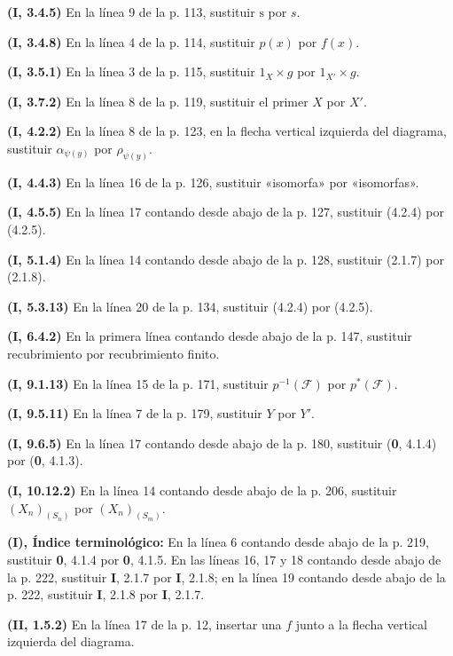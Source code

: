 \documentclass[10pt,oneside]{book}
\newcommand{\oldpage}[2][]{\setcounter{footnote}{0}\marginpar{\scriptsize\textbf{#1}~|~#2}\ignorespaces}
\begin{document}
\noindent\textbf{(I, 3.4.5)} En la línea 9 de la p. 113, sustituir
$\mathrm s$ por $s$.

\noindent\textbf{(I, 3.4.8)} En la línea 4 de la p. 114, sustituir $p(x)$ por
$f(x)$.

\noindent\textbf{(I, 3.5.1)} En la línea 3 de la p. 115, sustituir
$1_X\times g$ por $1_{X'}\times g$.

\noindent\textbf{(I, 3.7.2)} En la línea 8 de la p. 119, sustituir el primer
$X$ por $X'$.

\noindent\textbf{(I, 4.2.2)} En la línea 8 de la p. 123, en la flecha vertical
izquierda del diagrama, sustituir $\alpha_{\psi(y)}$ por $\rho_{\psi(y)}$.

\noindent\textbf{(I, 4.4.3)} En la línea 16 de la p. 126, sustituir «isomorfa»
por «isomorfas».

\noindent\textbf{(I, 4.5.5)} En la línea 17 contando desde abajo de la p. 127,
sustituir (4.2.4) por (4.2.5).

\noindent\textbf{(I, 5.1.4)} En la línea 14 contando desde abajo de la p. 128,
sustituir (2.1.7) por (2.1.8).

\noindent\textbf{(I, 5.3.13)} En la línea 20 de la p. 134, sustituir (4.2.4)
por (4.2.5).

\noindent\textbf{(I, 6.4.2)} En la primera línea contando desde abajo de la
p. 147, sustituir recubrimiento por recubrimiento finito.

\noindent\textbf{(I, 9.1.13)} En la línea 15 de la p. 171, sustituir
$p^{-1}(\mathscr F)$ por $p^*(\mathscr F)$.

\noindent\textbf{(I, 9.5.11)} En la línea 7 de la p. 179, sustituir $Y$ por
$Y'$.

\noindent\textbf{(I, 9.6.5)} En la línea 17 contando desde abajo de la p. 180,
sustituir (\textbf{0}, 4.1.4) por (\textbf{0}, 4.1.3).

\noindent\textbf{(I, 10.12.2)} En la línea 14 contando desde abajo de la p.
206, sustituir $(X_n)_{(S_n)}$ por $(X_n)_{(S_m)}$.

\clearpage
\oldpage[III]{218}
\noindent\textbf{(I), Índice terminológico:} En la línea 6 contando desde
abajo de la p. 219, sustituir \textbf{0}, 4.1.4 por \textbf{0}, 4.1.5. En las líneas 16, 17 y 18
contando desde abajo de la p. 222, sustituir \textbf{I}, 2.1.7 por \textbf{I}, 2.1.8; en la línea
19 contando desde abajo de la p. 222, sustituir \textbf{I}, 2.1.8 por \textbf{I}, 2.1.7.

\noindent\textbf{(II, 1.5.2)} En la línea 17 de la p. 12, insertar una $f$
junto a la flecha vertical izquierda del diagrama.
\end{document}
